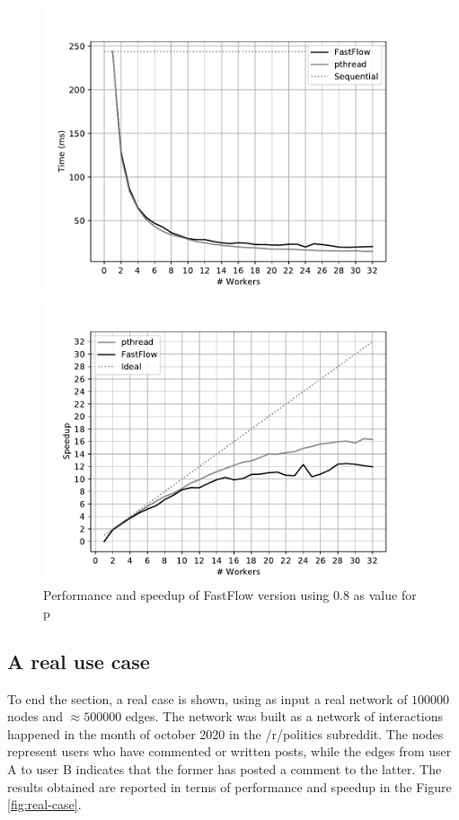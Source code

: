 \begin{figure}
    \centering
    \begin{minipage}{0.48\textwidth}
        \includegraphics[width=\textwidth]{plots/fastflow_performance_08_time.pdf}
    \end{minipage}
    \begin{minipage}{0.48\textwidth}
        \includegraphics[width=\textwidth]{plots/fastflow_speedup_08_time.pdf}
    \end{minipage}
    \caption{Performance and speedup of FastFlow version using 0.8 as value for p}
    \label{fig:fastflow_08}
\end{figure}
\subsection{A real use case}
To end the section, a real case is shown, using as
 input a real network of $100000$ nodes and $\approx 500000$ edges. The 
 network was built as a network
  of interactions happened in the 
  month of october 
 2020 in the /r/politics subreddit. The nodes represent users who have 
 commented or written posts, while the edges from user 
 A to user B indicates that the former has posted a comment to the latter. 
 The results obtained are reported in terms of performance and speedup in 
 the Figure  \ref{fig:real-case}.

